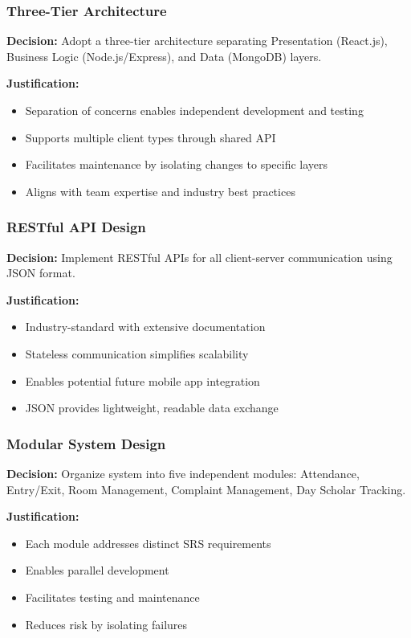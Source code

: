 \documentclass[12pt]{article}
\begin{document}
\subsubsection{Three-Tier Architecture}

\textbf{Decision:} Adopt a three-tier architecture separating Presentation (React.js), Business Logic (Node.js/Express), and Data (MongoDB) layers.

\textbf{Justification:}

\begin{itemize}
\item Separation of concerns enables independent development and testing
\item Supports multiple client types through shared API
\item Facilitates maintenance by isolating changes to specific layers
\item Aligns with team expertise and industry best practices
\end{itemize}

\subsubsection{RESTful API Design}

\textbf{Decision:} Implement RESTful APIs for all client-server communication using JSON format.

\textbf{Justification:}

\begin{itemize}
\item Industry-standard with extensive documentation
\item Stateless communication simplifies scalability
\item Enables potential future mobile app integration
\item JSON provides lightweight, readable data exchange
\end{itemize}

\subsubsection{Modular System Design}

\textbf{Decision:} Organize system into five independent modules: Attendance, Entry/Exit, Room Management, Complaint Management, Day Scholar Tracking.

\textbf{Justification:}

\begin{itemize}
\item Each module addresses distinct SRS requirements
\item Enables parallel development
\item Facilitates testing and maintenance
\item Reduces risk by isolating failures
\end{itemize}
\end{document}
